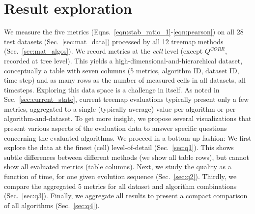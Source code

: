 \section{Result exploration}
\label{sec:mat_aggr}
%
We measure the five metrics (Eqns.~\ref{eqn:stab_ratio_1}-\ref{eqn:pearson}) on all 28 test datasets (Sec.~\ref{sec:mat_data}) processed by all 12 treemap methods (Sec.~\ref{sec:mat_algos}). We record metrics at the \emph{cell} level (except $Q^{CORR}$, recorded at tree level). This yields a high-dimensional-and-hierarchical dataset, conceptually a
 table with seven columns (5 metrics, algorithm ID, dataset ID, time step) and as many rows as the number of measured cells in all datasets, all timesteps. Exploring this data space is a challenge in itself. As noted in Sec.~\ref{sec:current_state}, current treemap evaluations typically present only a few metrics, aggregated to a single (typically average) value per algorithm or per algorithm-and-dataset. To get more insight, we propose several visualizations that present various aspects of the evaluation data to answer specific questions concerning the evaluated algorithms. We proceed in a bottom-up fashion: We first explore the data at the finest (cell) level-of-detail (Sec.~\ref{sec:q1}). This shows subtle differences between different methods (we show all table rows), but cannot show all evaluated metrics (table columns). Next, we study the quality as a function of time, for one given evolution sequence (Sec.~\ref{sec:q2}). Thirdly, we compare the aggregated 5 metrics for all dataset and algorithm combinations (Sec.~\ref{sec:q3}). Finally, we aggregate all results to present a compact comparison of all algorithms (Sec.~\ref{sec:q4}).

